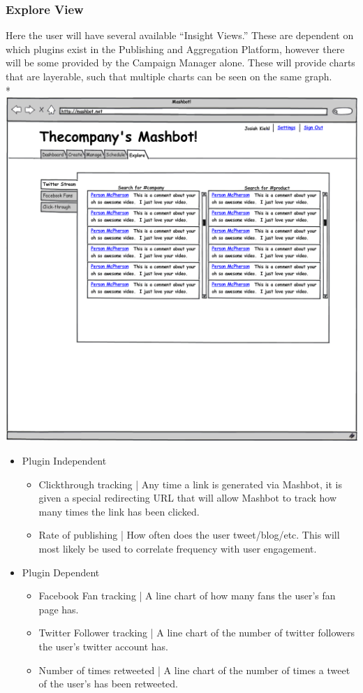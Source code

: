 \documentclass{article}
\begin{document}
\subsubsection{Explore View}
 Here the user will have several available ``Insight Views.''  These are dependent on which plugins exist in the Publishing and Aggregation Platform, however there will be some provided by the Campaign Manager alone.  These will provide charts that are layerable, such that multiple charts can be seen on the same graph. \\*
  \includegraphics[width=\textwidth]{../mockups/explore-twitter.png}
\begin{itemize}
\item Plugin Independent
  \begin{itemize}
  \item Clickthrough tracking | Any time a link is generated via Mashbot, it is given a special redirecting URL that will allow Mashbot to track how many times the link has been clicked.
  \item Rate of publishing | How often does the user tweet/blog/etc. This will most likely be used to correlate frequency with user engagement.
  \end{itemize}
\item Plugin Dependent
  \begin{itemize}
  \item Facebook Fan tracking | A line chart of how many fans the user's fan page has.
  \item Twitter Follower tracking | A line chart of the number of twitter followers the user's twitter account has.
  \item Number of times retweeted | A line chart of the number of times a tweet of the user's has been retweeted.
  \end{itemize}
\end{itemize}
\end{document}
